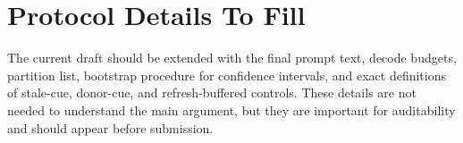 \documentclass{article}
\begin{document}
\section{Protocol Details To Fill}
\label{app:protocol-details}

The current draft should be extended with the final prompt text, decode
budgets, partition list, bootstrap procedure for confidence intervals,
and exact definitions of stale-cue, donor-cue, and refresh-buffered
controls.
These details are not needed to understand the main argument, but they
are important for auditability and should appear before submission.
\end{document}
